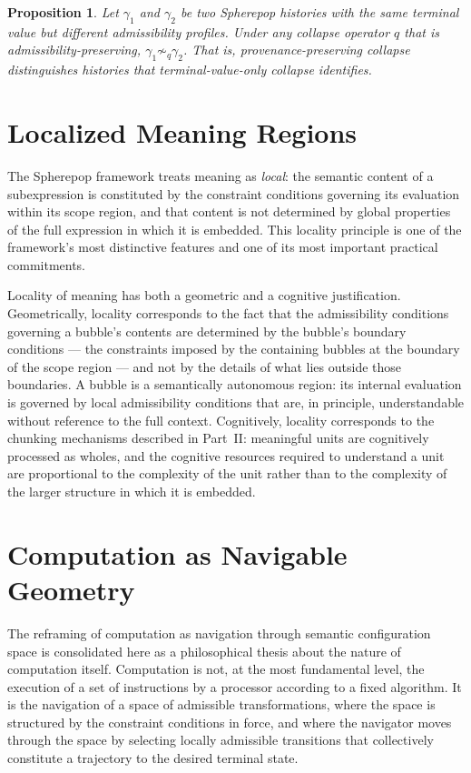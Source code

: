 \documentclass[12pt,openany]{book}
\theoremstyle{plain}
\newtheorem{proposition}[theorem]{Proposition}
\theoremstyle{definition}
\theoremstyle{remark}
\begin{document}
\begin{proposition}
Let $\gamma_1$ and $\gamma_2$ be two Spherepop histories with the same terminal value but different admissibility profiles. Under any collapse operator $q$ that is admissibility-preserving, $\gamma_1 \not\sim_q \gamma_2$. That is, provenance-preserving collapse distinguishes histories that terminal-value-only collapse identifies.
\end{proposition}

\section{Localized Meaning Regions}

The Spherepop framework treats meaning as \emph{local}: the semantic content of a subexpression is constituted by the constraint conditions governing its evaluation within its scope region, and that content is not determined by global properties of the full expression in which it is embedded. This locality principle is one of the framework's most distinctive features and one of its most important practical commitments.

Locality of meaning has both a geometric and a cognitive justification. Geometrically, locality corresponds to the fact that the admissibility conditions governing a bubble's contents are determined by the bubble's boundary conditions — the constraints imposed by the containing bubbles at the boundary of the scope region — and not by the details of what lies outside those boundaries. A bubble is a semantically autonomous region: its internal evaluation is governed by local admissibility conditions that are, in principle, understandable without reference to the full context. Cognitively, locality corresponds to the chunking mechanisms described in Part~II: meaningful units are cognitively processed as wholes, and the cognitive resources required to understand a unit are proportional to the complexity of the unit rather than to the complexity of the larger structure in which it is embedded.

\section{Computation as Navigable Geometry}

The reframing of computation as navigation through semantic configuration space is consolidated here as a philosophical thesis about the nature of computation itself. Computation is not, at the most fundamental level, the execution of a set of instructions by a processor according to a fixed algorithm. It is the navigation of a space of admissible transformations, where the space is structured by the constraint conditions in force, and where the navigator moves through the space by selecting locally admissible transitions that collectively constitute a trajectory to the desired terminal state.
\end{document}
